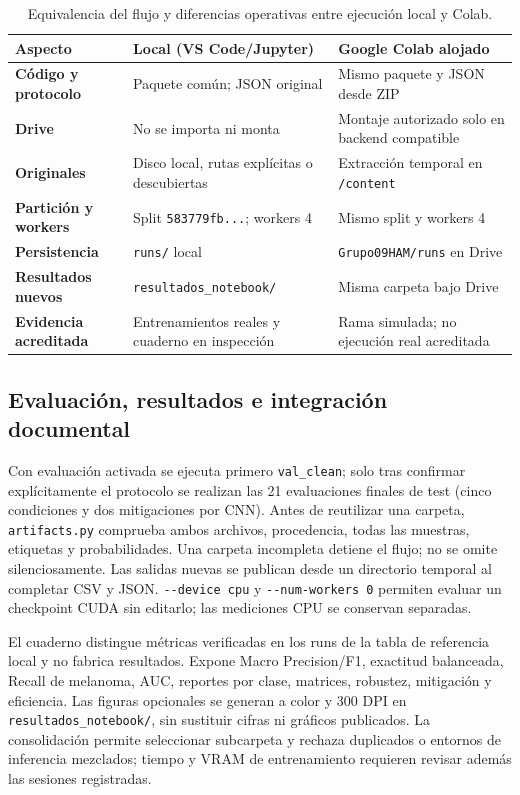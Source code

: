 \begin{table}[htbp]\centering\small
\caption{Equivalencia del flujo y diferencias operativas entre ejecución local y Colab.}
\begin{tabularx}{\textwidth}{@{}>{\bfseries}p{3.5cm}>{\raggedright\arraybackslash}X>{\raggedright\arraybackslash}X@{}}
\toprule
\textbf{Aspecto} & \textbf{Local (VS Code/Jupyter)} & \textbf{Google Colab alojado} \\ \midrule
Código y protocolo & Paquete común; JSON original & Mismo paquete y JSON desde ZIP \\
Drive & No se importa ni monta & Montaje autorizado solo en backend compatible \\
Originales & Disco local, rutas explícitas o descubiertas & Extracción temporal en \texttt{/content} \\
Partición y workers & Split \texttt{583779fb...}; workers 4 & Mismo split y workers 4 \\
Persistencia & \texttt{runs/} local & \texttt{Grupo09HAM/runs} en Drive \\
Resultados nuevos & \texttt{resultados\_notebook/} & Misma carpeta bajo Drive \\
Evidencia acreditada & Entrenamientos reales y cuaderno en inspección & Rama simulada; no ejecución real acreditada \\
\bottomrule
\end{tabularx}
\end{table}

\subsection{Evaluación, resultados e integración documental}
Con evaluación activada se ejecuta primero \texttt{val\_clean}; solo tras confirmar explícitamente el protocolo se realizan las 21 evaluaciones finales de test (cinco condiciones y dos mitigaciones por CNN). Antes de reutilizar una carpeta, \texttt{artifacts.py} comprueba ambos archivos, procedencia, todas las muestras, etiquetas y probabilidades. Una carpeta incompleta detiene el flujo; no se omite silenciosamente. Las salidas nuevas se publican desde un directorio temporal al completar CSV y JSON. \texttt{-{}-device cpu} y \texttt{-{}-num-workers 0} permiten evaluar un checkpoint CUDA sin editarlo; las mediciones CPU se conservan separadas.

El cuaderno distingue métricas verificadas en los runs de la tabla de referencia local y no fabrica resultados. Expone Macro Precision/F1, exactitud balanceada, Recall de melanoma, AUC, reportes por clase, matrices, robustez, mitigación y eficiencia. Las figuras opcionales se generan a color y 300 DPI en \texttt{resultados\_notebook/}, sin sustituir cifras ni gráficos publicados. La consolidación permite seleccionar subcarpeta y rechaza duplicados o entornos de inferencia mezclados; tiempo y VRAM de entrenamiento requieren revisar además las sesiones registradas.


